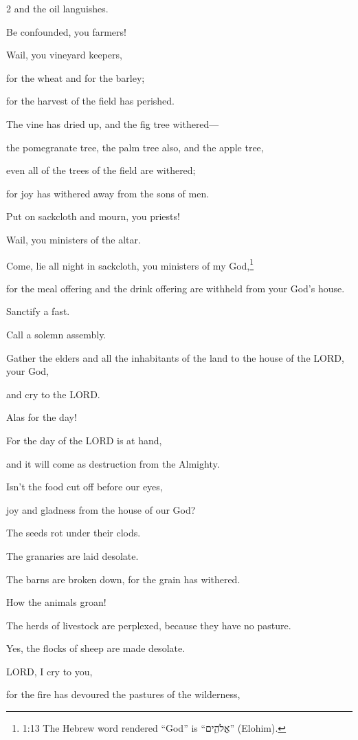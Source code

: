 \begin{multicols}{2}
and the oil languishes.

\myverse{}Be confounded, you farmers!

Wail, you vineyard keepers,

for the wheat and for the barley;

for the harvest of the field has perished.

\myverse{}The vine has dried up, and the fig tree withered—

the pomegranate tree, the palm tree also, and the apple tree,

even all of the trees of the field are withered;

for joy has withered away from the sons of men.

\myverse{}Put on sackcloth and mourn, you priests!

Wail, you ministers of the altar.

Come, lie all night in sackcloth, you ministers of my God,\footnote{1:13 The Hebrew word rendered “God” is “אֱלֹהִ֑ים” (Elohim).}

for the meal offering and the drink offering are withheld from your God’s house.

\myverse{}Sanctify a fast.

Call a solemn assembly.

Gather the elders and all the inhabitants of the land to the house of the LORD,
your God,

and cry to the LORD.

\myverse{}Alas for the day!

For the day of the LORD is at hand,

and it will come as destruction from the Almighty.

\myverse{}Isn’t the food cut off before our eyes,

joy and gladness from the house of our God?

\myverse{}The seeds rot under their clods.

The granaries are laid desolate.

The barns are broken down, for the grain has withered.

\myverse{}How the animals groan!

The herds of livestock are perplexed, because they have no pasture.

Yes, the flocks of sheep are made desolate.

\myverse{}LORD, I cry to you,

for the fire has devoured the pastures of the wilderness,


\end{multicols}
